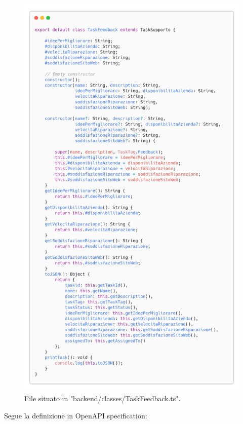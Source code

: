 \documentclass{report}
\begin{document}
\begin{figure}[H]
	\centering\includegraphics[width=1\textwidth]{images/code_task_feedback.png}
	File situato in "backend/classes/TaskFeedback.ts".
\end{figure}

Segue la definizione in OpenAPI specification:
\end{document}
